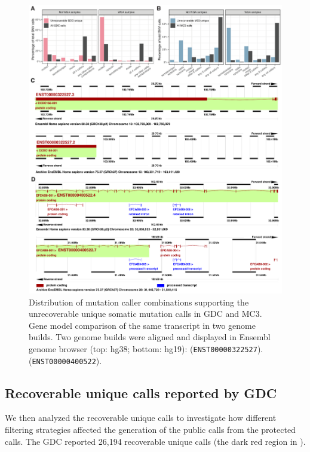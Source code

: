 \begin{figure}[tbp]
    \centering
    \includegraphics[width=\linewidth]{figures/chap02_mutation_pipeline_qc/supp_figure_combined.pdf}
    \caption{%
        Distribution of mutation caller combinations supporting the unrecoverable unique somatic  mutation calls in  GDC and  MC3.
        Gene model comparison of the same transcript in two genome builds. Two genome builds were aligned and displayed in Ensembl genome browser (top: hg38; bottom: hg19):
          (\texttt{ENST00000322527}).
          (\texttt{ENST00000400522}).
    }
    \label{fig:mut-call-qc-supp}
\end{figure}

\subsection{Recoverable unique calls reported by GDC}
We then analyzed the recoverable unique calls to investigate how different filtering strategies affected the generation of the public calls from the protected calls. The GDC reported 26,194 recoverable unique calls (the dark red region in ).

